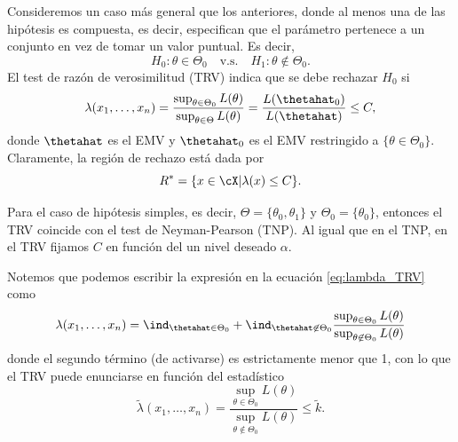 Consideremos un caso más general que los anteriores, donde al menos una de las hipótesis es compuesta, es decir, especifican que el parámetro pertenece a un conjunto en vez de tomar un valor puntual. Es decir, 
\begin{equation}
		H_0:\theta \in\Theta_0\quad \text{v.s.}\quad H_1:\theta \notin\Theta_0.
	\end{equation}
El test de razón de verosimilitud (TRV) indica que se debe rechazar $H_0$ si 
\begin{equation}
	\label{eq:lambda_TRV}
	\lambda(x_1,\ldots,x_n) = \frac{\sup_{\theta\in\Theta_0}L(\theta)}{\sup_{\theta\in\Theta}L(\theta)}
							= \frac{L(\thetahat_0)}{L(\thetahat)}\leq C,
\end{equation}
donde $\thetahat$ es el EMV y $\thetahat_0$ es el EMV restringido a $\{\theta\in\Theta_0\}$. Claramente, la región de rechazo está dada por 
\begin{equation}
	R^* = \{x\in\cX|\lambda(x)\leq C\}.
\end{equation}
\begin{remark}
	Para el caso de hipótesis simples, es decir, $\Theta = \{\theta_0,\theta_1\}$ y $\Theta_0 = \{\theta_0\}$, entonces el TRV coincide con el test de Neyman-Pearson (TNP). Al igual que en el TNP, en el TRV fijamos $C$ en función del un nivel deseado $\alpha$. 
\end{remark}


\begin{remark}
	Notemos que podemos escribir la expresión en la ecuación \eqref{eq:lambda_TRV} como 
	\begin{equation}
		\lambda(x_1,\ldots,x_n) =  \ind_{\thetahat\in\Theta_0} + \ind_{\thetahat\not\in\Theta_0} \frac{\sup_{\theta\in\Theta_0}L(\theta)}{\sup_{\theta\not\in\Theta_0}L(\theta)}
	\end{equation}
	donde el segundo término (de activarse) es estrictamente menor que 1, con lo que el TRV puede enunciarse en función del estadístico 
	\begin{equation}
		\tilde{\lambda}(x_1,\ldots,x_n) = \frac{\sup_{\theta\in\Theta_0}L(\theta)}{\sup_{\theta\not\in\Theta_0}L(\theta)} \leq \tilde{k}.
	\end{equation}
\end{remark}


